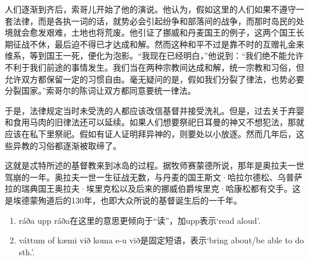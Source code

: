 \begin{translation*}{}
    人们逐渐到齐后，索哥儿开始了他的演说。他认为，假如这里的人们如果不遵守一套法律，而是各执一词的话，就势必会引起纷争和部落间的战争，而那时岛民的处境就会愈发艰难，土地也将荒废。他引证了挪威和丹麦国王的例子，这两个国王长期征战不休，最后迫不得已才达成和解。然而这种和平不过是靠不时的互赠礼金来维系，等到国王一死，便化为泡影。“我现在已经明白，”他说到：“我们绝不能允许不利于我们前途的事情发生。我们当在两种宗教间达成和解，统一宗教和习俗，但允许双方都保留一定的习惯自由。毫无疑问的是，假如我们分裂了律法，也势必要分裂国家。”索哥尔的陈词让双方都同意要统一律法。

    于是，法律规定当时未受洗的人都应该改信基督并接受洗礼。但是，过去关于弃婴和食用马肉的旧律法还可以延续。如果人们想要祭祀日耳曼的神又不想犯法，那就应该在私下里祭祀。假如有证人证明拜异神的，则要处以小放逐。然而几年后，这些异教的习俗都逐渐被取缔了。

    这就是忒特所述的基督教来到冰岛的过程。据牧师赛蒙德所说，那年是奥拉夫一世驾崩的一年。奥拉夫一世一生征战无数，与丹麦的国王斯文·哈拉尔德松、乌普萨拉的瑞典国王奥拉夫·埃里克松以及后来的挪威伯爵埃里克·哈康松都有交手。这是埃德蒙殉道后的130年，也即大众所说的基督诞生后的一千年。
\end{translation*}
\begin{grammar*}{}
    \begin{enumerate}[leftmargin=*]
        \item ráða upp
              ráða在这里的意思更倾向于“读”，加upp表示`read aloud'.
        \item váttum of kæmi við
              koma e-u við是固定短语，表示`bring about/be able to do sth.'.
    \end{enumerate}
\end{grammar*}
